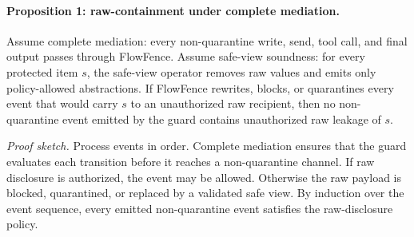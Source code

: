 \begin{center}
\end{center}

\paragraph{Proposition 1: raw-containment under complete mediation.}
Assume complete mediation: every non-quarantine write, send, tool call, and final output passes through FlowFence. Assume safe-view soundness: for every protected item $s$, the safe-view operator removes raw values and emits only policy-allowed abstractions. If FlowFence rewrites, blocks, or quarantines every event that would carry $s$ to an unauthorized raw recipient, then no non-quarantine event emitted by the guard contains unauthorized raw leakage of $s$.

\emph{Proof sketch.} Process events in order. Complete mediation ensures that the guard evaluates each transition before it reaches a non-quarantine channel. If raw disclosure is authorized, the event may be allowed. Otherwise the raw payload is blocked, quarantined, or replaced by a validated safe view. By induction over the event sequence, every emitted non-quarantine event satisfies the raw-disclosure policy.

